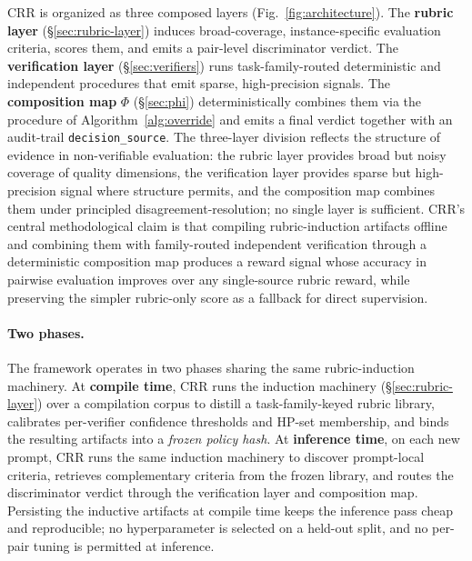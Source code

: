 CRR is organized as three composed layers (Fig.~\ref{fig:architecture}).
The \textbf{rubric layer} (\S\ref{sec:rubric-layer}) induces
broad-coverage, instance-specific evaluation criteria, scores them,
and emits a pair-level discriminator verdict.  The \textbf{verification
layer} (\S\ref{sec:verifiers}) runs task-family-routed deterministic
and independent procedures that emit sparse, high-precision signals.
The \textbf{composition map} $\Phi$ (\S\ref{sec:phi}) deterministically
combines them via the procedure of Algorithm~\ref{alg:override} and
emits a final verdict together with an audit-trail
\texttt{decision\_source}.  The three-layer division reflects the
structure of evidence in non-verifiable evaluation: the rubric layer
provides broad but noisy coverage of quality dimensions, the
verification layer provides sparse but high-precision signal where
structure permits, and the composition map combines them under
principled disagreement-resolution; no single layer is sufficient.
CRR's central methodological claim is that compiling rubric-induction
artifacts offline and combining them with family-routed independent
verification through a deterministic composition map produces a
reward signal whose accuracy in pairwise evaluation improves over
any single-source rubric reward, while preserving the simpler
rubric-only score as a fallback for direct supervision.

\paragraph{Two phases.}
The framework operates in two phases sharing the same rubric-induction
machinery.  At \textbf{compile time}, CRR runs the induction machinery
(\S\ref{sec:rubric-layer}) over a compilation corpus to distill a
task-family-keyed rubric library, calibrates per-verifier confidence
thresholds and HP-set membership, and binds the resulting artifacts
into a \emph{frozen policy hash}.  At \textbf{inference time}, on each
new prompt, CRR runs the same induction machinery to discover
prompt-local criteria, retrieves complementary criteria from the
frozen library, and routes the discriminator verdict through the
verification layer and composition map.  Persisting the inductive
artifacts at compile time keeps the inference pass cheap and
reproducible; no hyperparameter is selected on a held-out split, and
no per-pair tuning is permitted at inference.

